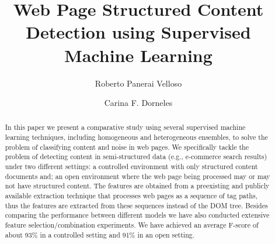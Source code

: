 \documentclass[runningheads]{llncs}
\begin{document}
\title{Web Page Structured Content Detection using Supervised Machine Learning}

%



\author{Roberto Panerai Velloso \and
Carina F. Dorneles}




\begin{abstract}
    In this paper we present a comparative study using several supervised 
    machine learning techniques, including homogeneous and heterogeneous
    ensembles, to solve the problem of classifying content and noise in web
    pages. We specifically tackle the problem of detecting content in 
    semi-structured data (e.g., e-commerce 
    search results) under two different
    settings: a controlled environment with only structured content documents
    and; an open environment where the web page being processed may or may
    not have structured content.
    The features are obtained from a preexisting and publicly available extraction 
    technique that processes web pages as a sequence of tag paths, thus 
    the features are extracted from these sequences instead of the DOM 
    tree. Besides comparing the performance between different models 
    we have also conducted extensive feature selection/combination 
    experiments. We have achieved an average F-score of about
    93\% in a controlled setting and 91\% in an open setting.
\end{abstract}




 
\end{document}
